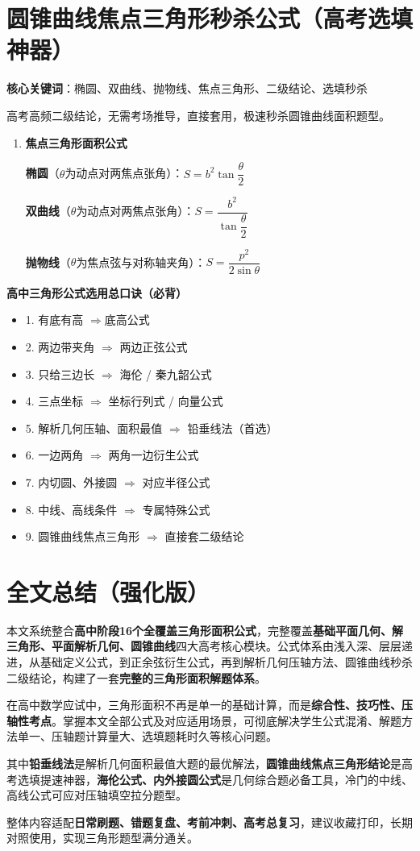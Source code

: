 \documentclass[10pt,CJKmath]{ctexart}
\begin{document}
\section*{圆锥曲线焦点三角形秒杀公式（高考选填神器）}

\textbf{核心关键词}：椭圆、双曲线、抛物线、焦点三角形、二级结论、选填秒杀

高考高频二级结论，无需考场推导，直接套用，极速秒杀圆锥曲线面积题型。
\begin{enumerate}[resume]
	\item \textbf{焦点三角形面积公式}

\textbf{椭圆}（$\theta$为动点对两焦点张角）：\colorbox{yellow!10}{$S=b^2\tan\dfrac{\theta}{2}$}

\textbf{双曲线}（$\theta$为动点对两焦点张角）：\colorbox{yellow!10}{$S=\dfrac{b^2}{\tan\dfrac{\theta}{2}}$}

\textbf{抛物线}（$\theta$为焦点弦与对称轴夹角）：\colorbox{yellow!10}{$S=\dfrac{p^2}{2\sin\theta}$}

\end{enumerate}

\begin{marker}
\textbf{高中三角形公式选用总口诀（必背）}

\begin{itemize}
	\item 1. 有底有高 $\Rightarrow$底高公式
	\item 2. 两边带夹角 $\Rightarrow$ 两边正弦公式
	\item 3. 只给三边长 $\Rightarrow$ 海伦 / 秦九韶公式
	\item 4. 三点坐标 $\Rightarrow$ 坐标行列式 / 向量公式
	\item 5. 解析几何压轴、面积最值 $\Rightarrow$ 铅垂线法（首选）
	\item 6. 一边两角 $\Rightarrow$ 两角一边衍生公式
	\item 7. 内切圆、外接圆 $\Rightarrow$ 对应半径公式
	\item 8. 中线、高线条件 $\Rightarrow$ 专属特殊公式
	\item 9. 圆锥曲线焦点三角形 $\Rightarrow$ 直接套二级结论
\end{itemize}
\end{marker}

\section*{全文总结（强化版）}

本文系统整合\textbf{高中阶段16个全覆盖三角形面积公式}，完整覆盖\textbf{基础平面几何、解三角形、平面解析几何、圆锥曲线}四大高考核心模块。公式体系由浅入深、层层递进，从基础定义公式，到正余弦衍生公式，再到解析几何压轴方法、圆锥曲线秒杀二级结论，构建了一套\textbf{完整的三角形面积解题体系}。

在高中数学应试中，三角形面积不再是单一的基础计算，而是\textbf{综合性、技巧性、压轴性考点}。掌握本文全部公式及对应适用场景，可彻底解决学生公式混淆、解题方法单一、压轴题计算量大、选填题耗时久等核心问题。

其中\textbf{铅垂线法}是解析几何面积最值大题的最优解法，\textbf{圆锥曲线焦点三角形结论}是高考选填提速神器，\textbf{海伦公式、内外接圆公式}是几何综合题必备工具，冷门的中线、高线公式可应对压轴填空拉分题型。

整体内容适配\textbf{日常刷题、错题复盘、考前冲刺、高考总复习}，建议收藏打印，长期对照使用，实现三角形题型满分通关。
\end{document}
